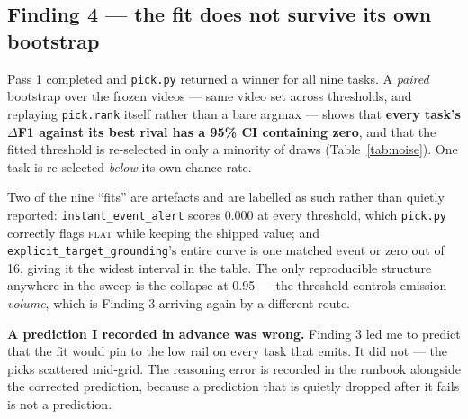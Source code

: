 \documentclass[11pt,a4paper]{article}
\begin{document}
\subsection{Finding 4 --- the fit does not survive its own bootstrap}

Pass 1 completed and \texttt{pick.py} returned a winner for all nine
tasks. A \emph{paired} bootstrap over the frozen videos --- same video set across
thresholds, and replaying \texttt{pick.rank} itself rather than a bare argmax ---
shows that \textbf{every task's $\Delta$F1 against its best rival has a 95\% CI
containing zero}, and that the fitted threshold is re-selected in only a minority
of draws (Table~\ref{tab:noise}). One task is re-selected \emph{below} its own
chance rate.

Two of the nine ``fits'' are artefacts and are labelled as such rather
than quietly reported: \texttt{instant\_event\_alert} scores 0.000 at every
threshold, which \texttt{pick.py} correctly flags \textsc{flat} while keeping the
shipped value; and \texttt{explicit\_target\_grounding}'s entire curve is one
matched event or zero out of 16, giving it the widest interval in the table. The
only reproducible structure anywhere in the sweep is the collapse at 0.95 --- the
threshold controls emission \emph{volume}, which is Finding 3 arriving again by a
different route.

\textbf{A prediction I recorded in advance was wrong.} Finding 3 led me
to predict that the fit would pin to the low rail on every task that emits.
It did not --- the picks scattered mid-grid. The reasoning error is recorded in
the runbook alongside the corrected prediction, because a prediction that is
quietly dropped after it fails is not a prediction.
\end{document}
